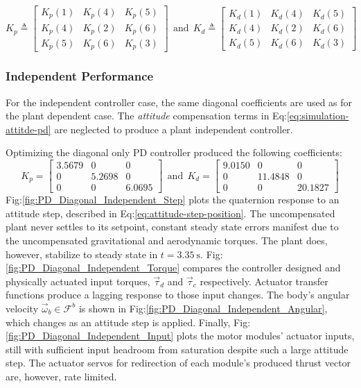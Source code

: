 \begin{equation}\label{eq:simulation-attitde-pd-symmetric-coefficients}
K_p\triangleq \begin{bmatrix}
K_p(1) & K_p(4) & K_p(5)\\
K_p(4) & K_p(2) & K_p(6)\\
K_p(5) & K_p(6) & K_p(3)
\end{bmatrix}
~~\text{and}~~K_d\triangleq \begin{bmatrix}
K_d(1) & K_d(4) & K_d(5)\\
K_d(4) & K_d(2) & K_d(6)\\
K_d(5) & K_d(6) & K_d(3)
\end{bmatrix}
\end{equation}
\subsubsection{Independent Performance}
\label{subsubsec:simulation.atttiude.pd.independent}
For the independent controller case, the same diagonal coefficients are used as for the plant dependent case. The \emph{attitude} compensation terms in Eq:\ref{eq:simulation-attitde-pd} are neglected to produce a plant independent controller. 
\par
Optimizing the diagonal only PD controller produced the following coefficients:
\begin{equation}\label{eq:optimized-pd-independent}
K_p = \begin{bmatrix}
3.5679 & 0 & 0\\
0 & 5.2698 & 0\\
0 & 0 & 6.0695
\end{bmatrix}
~~\text{and}~~K_d = \begin{bmatrix}
9.0150 & 0 & 0\\
0 & 11.4848 & 0\\
0 & 0 & 20.1827
\end{bmatrix}
\end{equation}
Fig:\ref{fig:PD_Diagonal_Independent_Step} plots the quaternion response to an attitude step, described in Eq:\ref{eq:attitude-step-position}. The uncompensated plant never settles to its setpoint, constant steady state errors manifest due to the uncompensated gravitational and aerodynamic torques. The plant does, however, stabilize to steady state in $t = 3.35~\text{s}$. Fig:\ref{fig:PD_Diagonal_Independent_Torque} compares the controller designed and physically actuated input torques, $\vec{\tau}_d$ and $\vec{\tau}_c$ respectively. Actuator transfer functions produce a lagging response to those input changes. The body's angular velocity $\vec{\omega}_b\in\mathcal{F}^{b}$ is shown in Fig:\ref{fig:PD_Diagonal_Independent_Angular}, which changes as an attitude step is applied. Finally, Fig:\ref{fig:PD_Diagonal_Independent_Input} plots the motor modules' actuator inputs, still with sufficient input headroom from saturation despite such a large attitude step. The actuator servos for redirection of each module's produced thrust vector are, however, rate limited.
